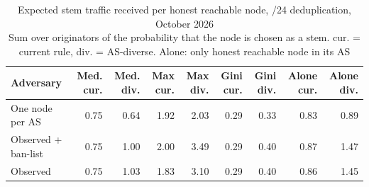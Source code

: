 \begin{table}[t]
\caption{
{\fontsize{20}{25}\selectfont  Expected stem traffic received per honest reachable node, /24 deduplication, October 2026\small } \\ 
{\fontsize{14}{17}\selectfont  Sum over originators of the probability that the node is chosen as a stem. cur. = current rule, div. = AS-diverse. Alone: only honest reachable node in its AS\small }
} 
\begin{tabular*}{\linewidth}{@{\extracolsep{\fill}}lrrrrrrrr}
\toprule
Adversary & Med. cur. & Med. div. & Max cur. & Max div. & Gini cur. & Gini div. & Alone cur. & Alone div. \\ 
\midrule\addlinespace[2.5pt]
One node per AS & 0.75 & 0.64 & 1.92 & 2.03 & 0.29 & 0.33 & 0.83 & 0.89 \\ 
Observed + ban-list & 0.75 & 1.00 & 2.00 & 3.49 & 0.29 & 0.40 & 0.87 & 1.47 \\ 
Observed & 0.75 & 1.03 & 1.83 & 3.10 & 0.29 & 0.40 & 0.86 & 1.45 \\ 
\bottomrule
\end{tabular*}
\label{table-stemload}
\end{table}
